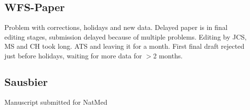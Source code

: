 \documentclass[a4paper,twoside,english,DIV=calc]{scrartcl}
\begin{document}
\subsection{WFS-Paper}
Problem with corrections, holidays and new data. Delayed paper is in final editing stages, submission delayed because of multiple problems. Editing by JCS, MS and CH took long. ATS and leaving it for a month. First final draft rejected just before holidays, waiting for more data for $>$2 months.

\subsection{Sausbier}
Manuscript submitted for NatMed



\end{document}
